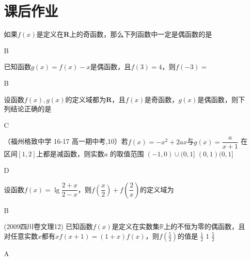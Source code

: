 \section{课后作业}
  \begin{exercise}
    \item
      如果$f(x)$是定义在$\mathbf{R}$上的奇函数，那么下列函数中一定是偶函数的是\xz      {}
      \begin{answer}
        B
      \end{answer}
    \item
      已知函数$g(x)=f(x)-x$是偶函数，且$ f(3)=4 $，则$ f(-3)= $\xz
      \begin{answer}
        B
      \end{answer}
    \item
      设函数$f(x),g(x)$的定义域都为$\mathbf{R}$，且$f(x)$是奇函数，$g(x)$是偶函数，则下列结论正确的是\xz
      \begin{answer}
        C
      \end{answer}
    \item
      （福州格致中学 16-17 高一期中考,10）若$f(x)=-x^2+2ax$与$g(x)=\dfrac a{x+1}$ 在区间$[1,2]$上都是减函数，则实数$a$ 的取值范围\xz
          {$(-1,0)\cup(0,1]$}
          {$(0,1)$}{$(0,1]$}
      \begin{answer}
        D
      \end{answer}
    \item
      设函数$f(x)=\lg \dfrac{2+x}{2-x}$，则$ f\left(\dfrac{x}{2}\right)+f\left(\dfrac{2}{x}\right) $的定义域为\xz
      \begin{answer}
        B
      \end{answer}
    \item
      (2009四川卷文理12) 已知函数$f(x)$是定义在实数集$\mathbb{R}$上的不恒为零的偶函数，且对任意实数$x$都有$xf(x+1)=(1+x)f(x) $，则$f(\frac{5}{2}) $的值是\xz
      {$\frac12$}
      {1}
      {$\frac52$}
      \begin{answer}
      A
      \end{answer}
    \item

\end{exercise}
